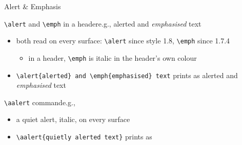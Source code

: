 \documentclass[presentation,bologna,apice]{beamer}\mode<presentation>{\usetheme{AMSUniBo}}
\begin{document}
\begin{frame}[c,fragile]{Alert \& Emphasis}
%
\begin{block}{\texttt{\textbackslash{}alert} and \texttt{\textbackslash{}emph} in a header\textemdash{}e.g., \alert{alerted} and \emph{emphasised} text}
\begin{itemize}
	\item both read on every surface: \texttt{\textbackslash{}alert} since style 1.8, \texttt{\textbackslash{}emph} since 1.7.4
	\begin{itemize}
		\item in a header, \texttt{\textbackslash{}emph} is italic in the header's own colour
	\end{itemize}
	\item[e.g.] \verb|\alert{alerted} and \emph{emphasised} text| prints as \alert{alerted} and \emph{emphasised} text
\end{itemize}
\end{block}
%
\begin{block}{\texttt{\textbackslash{}aalert} command\textemdash{}e.g., }
\begin{itemize}
	\item a quiet alert, italic, on every surface
	\item[e.g.] \verb|| prints as \aalert{quietly alerted text}
\end{itemize}
\end{block}
%
\end{frame}
\end{document}
